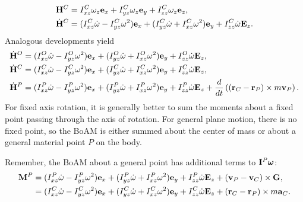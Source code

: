 \documentclass[
  letterpaper,
  DIV=11,
  numbers=noendperiod]{scrreprt}
\newcommand{\bomega}{\boldsymbol{\omega}}
\begin{document}
\begin{align}
    \begin{split}
        {\bf H}^C &= I_{xz}^C\omega_z{\bf e}_x+I_{yz}^C\omega_z{\bf e}_y+I_{zz}^C\omega_z{\bf e}_z,\\
        \dot{\bf H}^C &= (I_{xz}^C\dot{\omega}-I_{yz}^C\omega^2){\bf e}_x+(I_{yz}^C\dot{\omega}+I_{xz}^C\omega^2){\bf e}_y+I_{zz}^C\dot{\omega}{\bf E}_z.
    \end{split}
\end{align} Analogous developments yield \begin{align}
    \begin{split}
        & \dot{\bf H}^O = (I_{xz}^O\dot{\omega}-I_{yz}^O\omega^2){\bf e}_x+(I_{yz}^O\dot{\omega}+I_{xz}^O\omega^2){\bf e}_y+I_{zz}^O\dot{\omega}{\bf E}_z,\\
        & \dot{\bf H}^C = (I_{xz}^C\dot{\omega}-I_{yz}^C\omega^2){\bf e}_x+(I_{yz}^C\dot{\omega}+I_{xz}^C\omega^2){\bf e}_y+I_{zz}^C\dot{\omega}{\bf E}_z,\\
        & \dot{\bf H}^P = (I_{xz}^P\dot{\omega}-I_{yz}^P\omega^2){\bf e}_x+(I_{yz}^P\dot{\omega}+I_{xz}^P\omega^2){\bf e}_y+I_{zz}^P\dot{\omega}{\bf E}_z+\frac{d}{dt}\left(({\bf r}_C-{\bf r}_P)\times m{\bf v}_P\right).
    \end{split}
\end{align} For fixed axis rotation, it is generally better to sum the
moments about a fixed point passing through the axis of rotation. For
general plane motion, there is no fixed point, so the BoAM is either
summed about the center of mass or about a general material point \(P\)
on the body.

\begin{tcolorbox}[enhanced jigsaw, arc=.35mm, bottomrule=.15mm, bottomtitle=1mm, breakable, colback=white, colbacktitle=quarto-callout-important-color!10!white, colframe=quarto-callout-important-color-frame, coltitle=black, left=2mm, leftrule=.75mm, opacityback=0, opacitybacktitle=0.6, rightrule=.15mm, title=\textcolor{quarto-callout-important-color}{\faExclamation}\hspace{0.5em}{Note!}, titlerule=0mm, toprule=.15mm, toptitle=1mm]

Remember, the BoAM about a general point has additional terms to
\({\bf I}^P\bomega\): \begin{align}
    \begin{split}
        {\bf M}^P &= (I_{xz}^P\dot{\omega}-I_{yz}^P\omega^2){\bf e}_x+(I_{yz}^P\dot{\omega}+I_{xz}^P\omega^2){\bf e}_y+I_{zz}^P\dot{\omega}{\bf E}_z+({\bf v}_P-{\bf v}_C)\times{\bf G},\\
        &= (I_{xz}^C\dot{\omega}-I_{yz}^C\omega^2){\bf e}_x+(I_{yz}^C\dot{\omega}+I_{xz}^C\omega^2){\bf e}_y+I_{zz}^C\dot{\omega}{\bf E}_z + ({\bf r}_C-{\bf r}_P)\times m{\bf a}_C.
    \end{split}
\end{align}

\end{tcolorbox}
\end{document}
